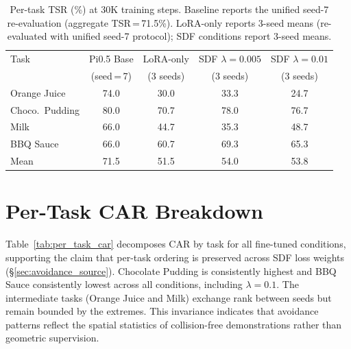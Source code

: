 \begin{table}[h]
\centering
\caption{Per-task TSR (\%) at 30K training steps. Baseline reports the unified seed-7 re-evaluation (aggregate TSR\,=\,71.5\%). LoRA-only reports 3-seed means (re-evaluated with unified seed-7 protocol); SDF conditions report 3-seed means.}
\label{tab:per_task_tsr}
\vspace{2pt}
\small
\begin{tabular}{lcccc}
\toprule
Task & Pi0.5 Base & LoRA-only & SDF $\lambda{=}0.005$ & SDF $\lambda{=}0.01$ \\
 & (seed\,=\,7) & (3 seeds) & (3 seeds) & (3 seeds) \\
\midrule
Orange Juice      & 74.0 & 30.0 & 33.3 & 24.7 \\
Choco.\ Pudding   & 80.0 & 70.7 & 78.0 & 76.7 \\
Milk              & 66.0 & 44.7 & 35.3 & 48.7 \\
BBQ Sauce         & 66.0 & 60.7 & 69.3 & 65.3 \\
\midrule
Mean              & 71.5 & 51.5 & 54.0 & 53.8 \\
\bottomrule
\end{tabular}
\end{table}

\section{Per-Task CAR Breakdown}\label{sec:appendix_pertask_car}

Table~\ref{tab:per_task_car} decomposes CAR by task for all fine-tuned conditions, supporting the claim that per-task ordering is preserved across SDF loss weights (\S\ref{sec:avoidance_source}). Chocolate Pudding is consistently highest and BBQ Sauce consistently lowest across all conditions, including $\lambda = 0.1$. The intermediate tasks (Orange Juice and Milk) exchange rank between seeds but remain bounded by the extremes. This invariance indicates that avoidance patterns reflect the spatial statistics of collision-free demonstrations rather than geometric supervision.


